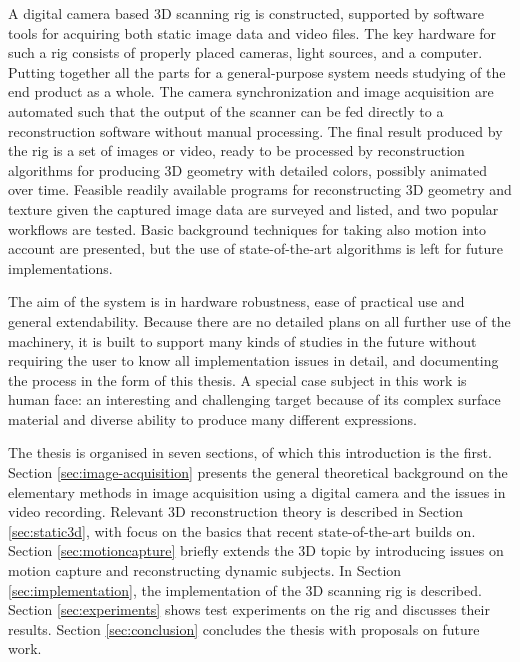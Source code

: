 
A digital camera based 3D scanning rig is constructed, supported by software tools for acquiring both static image data and video files.
The key hardware for such a rig consists of properly placed cameras, light sources, and a computer.
Putting together all the parts for a general-purpose system needs studying of the end product as a whole.
The camera synchronization and image acquisition are automated such that the output of the scanner can be fed directly to a reconstruction software without manual processing.
The final result produced by the rig is a set of images or video, ready to be processed by reconstruction algorithms for producing 3D geometry with detailed colors, possibly animated over time.
Feasible readily available programs for reconstructing 3D geometry and texture given the captured image data are surveyed and listed, and two popular workflows are tested.
Basic background techniques for taking also motion into account are presented, but the use of state-of-the-art algorithms is left for future implementations.


The aim of the system is in hardware robustness, ease of practical use and general extendability.
Because there are no detailed plans on all further use of the machinery, it is built to support many kinds of studies in the future without requiring the user to know all implementation issues in detail, and documenting the process in the form of this thesis.
A special case subject in this work is human face: an interesting and challenging target because of its complex surface material and diverse ability to produce many different expressions.


The thesis is organised in seven sections, of which this introduction is the first.
Section \ref{sec:image-acquisition} presents the general theoretical background on the elementary methods in image acquisition using a digital camera and the issues in video recording.
Relevant 3D reconstruction theory is described in Section \ref{sec:static3d}, with focus on the basics that recent state-of-the-art builds on.
Section \ref{sec:motioncapture} briefly extends the 3D topic by introducing issues on motion capture and reconstructing dynamic subjects.
In Section \ref{sec:implementation}, the implementation of the 3D scanning rig is described.
Section \ref{sec:experiments} shows test experiments on the rig and discusses their results.
Section \ref{sec:conclusion} concludes the thesis with proposals on future work.
